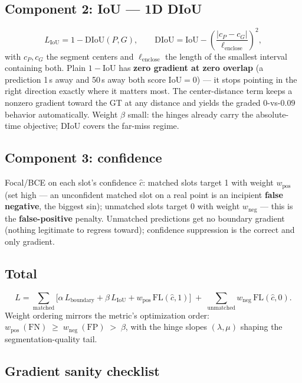 \documentclass[11pt]{article}
\newcommand{\iou}{\mathrm{IoU}}
\newcommand{\diou}{\mathrm{DIoU}}
\begin{document}
\subsection{Component 2: IoU --- 1D DIoU}

\[
L_{\iou} = 1 - \diou(P, G), \qquad
\diou = \iou - \left( \frac{|c_P - c_G|}{\ell_{\text{enclose}}} \right)^{\!2},
\]
with $c_P, c_G$ the segment centers and $\ell_{\text{enclose}}$ the length of the smallest
interval containing both. Plain $1-\iou$ has \textbf{zero gradient at zero overlap} (a
prediction 1\,s away and 50\,s away both score $\iou = 0$) --- it stops pointing in the
right direction exactly where it matters most. The center-distance term keeps a nonzero
gradient toward the GT at any distance and yields the graded $0$-vs-$0.09$ behavior
automatically. Weight $\beta$ small: the hinges already carry the absolute-time
objective; DIoU covers the far-miss regime.

\subsection{Component 3: confidence}

Focal/BCE on each slot's confidence $\hat{c}$: matched slots target 1 with weight
$w_{\text{pos}}$ (set high --- an unconfident matched slot on a real point is an incipient
\textbf{false negative}, the biggest sin); unmatched slots target 0 with weight
$w_{\text{neg}}$ --- this is the \textbf{false-positive} penalty. Unmatched predictions
get no boundary gradient (nothing legitimate to regress toward); confidence suppression
is the correct and only gradient.

\subsection{Total}

\[
L = \sum_{\text{matched}} \Big[ \alpha \, L_{\text{boundary}} + \beta \, L_{\iou}
    + w_{\text{pos}} \, \mathrm{FL}(\hat{c}, 1) \Big]
  \;+\; \sum_{\text{unmatched}} w_{\text{neg}} \, \mathrm{FL}(\hat{c}, 0).
\]
Weight ordering mirrors the metric's optimization order:
$w_{\text{pos}} \ (\mathrm{FN}) \;\ge\; w_{\text{neg}} \ (\mathrm{FP}) \;>\; \beta$,
with the hinge slopes $(\lambda, \mu)$ shaping the segmentation-quality tail.

\subsection{Gradient sanity checklist}
\end{document}
